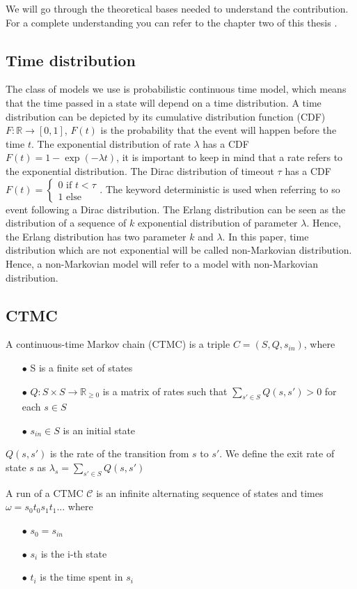 We will go through the theoretical bases needed to understand the contribution. For a complete understanding you can refer to the chapter two of this thesis \cite{Korenciak2018thesis}.
\subsection{Time distribution}
The class of models we use is probabilistic continuous time model, which means that the time passed in a state will depend on a time distribution. A time distribution can be depicted by its cumulative distribution function (CDF) $F : \mathbb{R} \rightarrow[0,1]$, $F(t)$ is the probability that the event will happen before the time $t$. The exponential distribution of rate $\lambda$ has a CDF $F(t) = 1 - \exp(-\lambda t)$, it is important to keep in mind that a rate refers to the exponential distribution. The Dirac distribution of timeout $\tau$ has a CDF $F(t) = 
\left\{
	\begin{array}{l}
		0 \text{ if } t < \tau\\
		1\text{ else}
	\end{array}
\right.$. The keyword deterministic is used when referring to so event following a Dirac distribution.
The Erlang distribution can be seen as the distribution of a sequence of $k$ exponential distribution of parameter $\lambda$. Hence, the Erlang distribution has two parameter $k$ and $\lambda$. 
In this paper, time distribution which are not exponential will be called non-Markovian distribution. Hence, a non-Markovian model will refer to a model with non-Markovian distribution.
\subsection{CTMC}
\label{CTMC_def}
A continuous-time Markov chain (CTMC) is a triple $C = (S,Q,s_{in})$, where 
\begin{itemize}
	\item[$\bullet$] S is a finite set of states
	\item[$\bullet$] $Q : S \times S \rightarrow \mathbb{R}_{\geq 0}$ is a matrix of rates such that $\sum_{s' \in S} Q(s,s')  > 0$ for each $s \in S$
	\item[$\bullet$] $s_{in} \in S$ is an initial state
\end{itemize} 
$Q(s,s')$ is the rate of the transition from $s$ to $s'$.
We define the exit rate of state $s$ as $\lambda_s = \sum_{s' \in S} Q(s,s')$

A run of a CTMC $\mathcal{C}$ is an infinite alternating sequence of states and times $\omega = s_0t_0s_1t_1...$ where 
\begin{itemize}
	\item[$\bullet$] $s_0 = s_{in}$
	\item[$\bullet$] $s_i$ is the i-th state
	\item[$\bullet$] $t_i$ is the time spent in $s_i$
\end{itemize}


